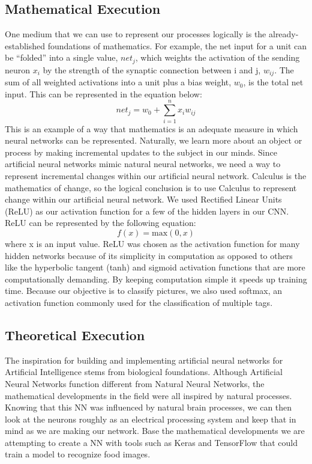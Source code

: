 \documentclass[conference]{IEEEtran}
\begin{document}
\subsection{Mathematical Execution}
One medium that we can use to represent our processes logically is the already-established foundations of mathematics. For example, the net input for a unit can be “folded” into a single value, $net_{j}$, which weights the activation of the sending neuron $x_{i}$ by the strength of the synaptic connection between i and j, $w_{ij}$. The sum of all weighted activations into a unit plus a bias weight, $w_{0}$, is the total net input. This can be represented in the equation below:
\begin{equation}
net_{j} = w_{0} + \sum_{i = 1}^{n}{x_{i}w_{ij}}\label{eq}
\end{equation}
This is an example of a way that mathematics is an adequate measure in which neural networks can be represented. Naturally, we learn more about an object or process by making incremental updates to the subject in our minds. Since artificial neural networks mimic natural neural networks, we need a way to represent incremental changes within our artificial neural network. Calculus is the mathematics of change, so the logical conclusion is to use Calculus to represent change within our artificial neural network. 
We used Rectified Linear Units (ReLU) as our activation function for a few of the hidden layers in our CNN. ReLU can be represented by the following equation:
\begin{equation}
f(x) = \mathrm{max}(0,x)\label{eq}
\end{equation}
where x is an input value. ReLU was chosen as the activation function for many hidden networks because of its simplicity in computation as opposed to others like the hyperbolic tangent (tanh) and sigmoid activation functions that are more computationally demanding. By keeping computation simple it speeds up training time. Because our objective is to classify pictures, we also used softmax, an activation function commonly used for the classification of multiple tags.
\subsection{Theoretical Execution}
The inspiration for building and implementing artificial neural networks for Artificial Intelligence stems from biological foundations. Although Artificial Neural Networks function different from Natural Neural Networks, the mathematical developments in the field were all inspired by natural processes. Knowing that this NN was influenced by natural brain processes, we can then look at the neurons roughly as an electrical processing system and keep that in mind as we are making our network. Base the mathematical developments we are attempting to create a NN with tools such as Keras and TensorFlow that could train a model to recognize food images.
\end{document}
